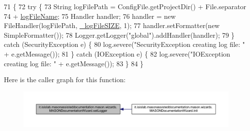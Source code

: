 \begin{DoxyCode}
71                              \{
72         \textcolor{keywordflow}{try} \{
73             String logFilePath = ConfigFile.getProjectDir() + File.separator
74                     + \hyperlink{classit_1_1isislab_1_1masonassisteddocumentation_1_1mason_1_1wizards_1_1_m_a_s_o_n_documentation_wizard_a4bd1c3db48ee70d751a4249cc3cf97c3}{logFileName};
75             Handler handler;
76             handler = \textcolor{keyword}{new} FileHandler(logFilePath, \hyperlink{classit_1_1isislab_1_1masonassisteddocumentation_1_1mason_1_1wizards_1_1_m_a_s_o_n_documentation_wizard_a988e57db933c354c9f7822a575c3b291}{\_logFileSIZE}, 1);
77             handler.setFormatter(\textcolor{keyword}{new} SimpleFormatter());
78             Logger.getLogger(\textcolor{stringliteral}{"global"}).addHandler(handler);
79         \} \textcolor{keywordflow}{catch} (SecurityException e) \{
80             log.severe(\textcolor{stringliteral}{"SecurityException creating log file: "} + e.getMessage());
81         \} \textcolor{keywordflow}{catch} (IOException e) \{
82             log.severe(\textcolor{stringliteral}{"IOException creating log file: "} + e.getMessage());
83         \}
84     \}
\end{DoxyCode}


Here is the caller graph for this function\-:\nopagebreak
\begin{figure}[H]
\begin{center}
\leavevmode
\includegraphics[width=350pt]{classit_1_1isislab_1_1masonassisteddocumentation_1_1mason_1_1wizards_1_1_m_a_s_o_n_documentation_wizard_a82d1898a0c9e9c4ae83e19bf1f024238_icgraph}
\end{center}
\end{figure}




